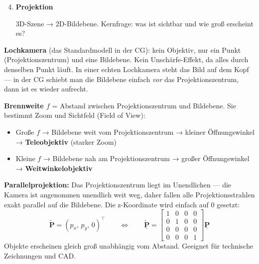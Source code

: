 \documentclass[12pt, a4paper]{article}
\begin{document}
\begin{enumerate}
  \setcounter{enumi}{3}

  \item \textbf{Projektion}

  3D-Szene → 2D-Bildebene. Kernfrage: was ist sichtbar und wie groß erscheint es?

\end{enumerate}


\textbf{Lochkamera} (das Standardmodell in der CG): kein Objektiv, nur ein Punkt (Projektionszentrum) und eine Bildebene. Kein Unschärfe-Effekt, da alles durch denselben Punkt läuft. In einer echten Lochkamera steht das Bild auf dem Kopf — in der CG schiebt man die Bildebene einfach \textit{vor} das Projektionszentrum, dann ist es wieder aufrecht.

\textbf{Brennweite $f$} = Abstand zwischen Projektionszentrum und Bildebene. Sie bestimmt Zoom und Sichtfeld (Field of View):
\begin{itemize}
  \item Große $f$ → Bildebene weit vom Projektionszentrum → kleiner Öffnungswinkel → \textbf{Teleobjektiv} (starker Zoom)
  \item Kleine $f$ → Bildebene nah am Projektionszentrum → großer Öffnungswinkel → \textbf{Weitwinkelobjektiv}
\end{itemize}

\textbf{Parallelprojektion:} Das Projektionszentrum liegt im Unendlichen — die Kamera ist angenommen unendlich weit weg, daher fallen alle Projektionsstrahlen exakt parallel auf die Bildebene. Die z-Koordinate wird einfach auf 0 gesetzt:
\[
  \tilde{\mathbf{P}} = (p_x,\, p_y,\, 0)^\top
  \qquad \Leftrightarrow \qquad
  \tilde{\underline{\mathbf{P}}} =
  \begin{bmatrix}1&0&0&0\\0&1&0&0\\0&0&0&0\\0&0&0&1\end{bmatrix}
  \underline{\mathbf{P}}
\]
Objekte erscheinen gleich groß unabhängig vom Abstand. Geeignet für technische Zeichnungen und CAD.
\end{document}
